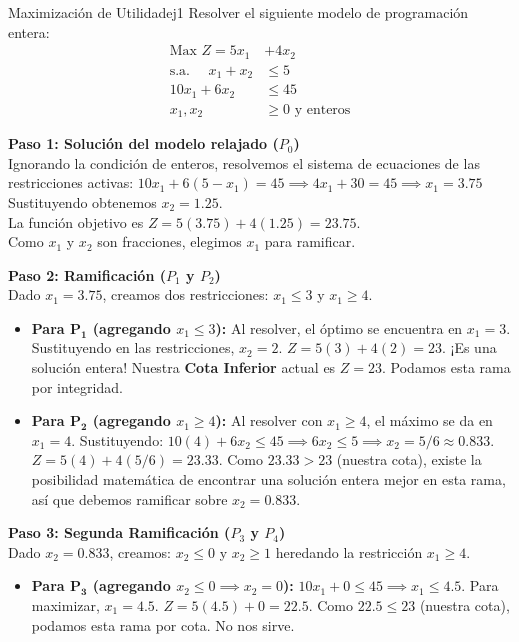 \documentclass[10pt,a4paper]{article}
\begin{document}
\begin{ejercicio}{Maximización de Utilidad}{ej1}
Resolver el siguiente modelo de programación entera:
\begin{align*}
    \text{Max } Z = 5x_1 &+ 4x_2 \\
    \text{s.a. } \quad x_1 + x_2 &\le 5 \\
    10x_1 + 6x_2 &\le 45 \\
    x_1, x_2 &\ge 0 \text{ y enteros}
\end{align*}

\textbf{Paso 1: Solución del modelo relajado ($P_0$)} \\
Ignorando la condición de enteros, resolvemos el sistema de ecuaciones de las restricciones activas:
$10x_1 + 6(5 - x_1) = 45 \implies 4x_1 + 30 = 45 \implies x_1 = 3.75$ \\
Sustituyendo obtenemos $x_2 = 1.25$. \\
La función objetivo es $Z = 5(3.75) + 4(1.25) = 23.75$. \\
Como $x_1$ y $x_2$ son fracciones, elegimos $x_1$ para ramificar.

\vspace{0.3cm}
\textbf{Paso 2: Ramificación ($P_1$ y $P_2$)} \\
Dado $x_1 = 3.75$, creamos dos restricciones: $x_1 \le 3$ y $x_1 \ge 4$.
\begin{itemize}
    \item \textbf{Para $\mathbf{P_1}$ (agregando $x_1 \le 3$):} 
    Al resolver, el óptimo se encuentra en $x_1 = 3$. Sustituyendo en las restricciones, $x_2 = 2$.
    $Z = 5(3) + 4(2) = 23$. ¡Es una solución entera! Nuestra \textbf{Cota Inferior} actual es $Z = 23$. Podamos esta rama por integridad.
    
    \item \textbf{Para $\mathbf{P_2}$ (agregando $x_1 \ge 4$):}
    Al resolver con $x_1 \ge 4$, el máximo se da en $x_1 = 4$.
    Sustituyendo: $10(4) + 6x_2 \le 45 \implies 6x_2 \le 5 \implies x_2 = 5/6 \approx 0.833$.
    $Z = 5(4) + 4(5/6) = 23.33$.
    Como $23.33 > 23$ (nuestra cota), existe la posibilidad matemática de encontrar una solución entera mejor en esta rama, así que debemos ramificar sobre $x_2 = 0.833$.
\end{itemize}

\textbf{Paso 3: Segunda Ramificación ($P_3$ y $P_4$)} \\
Dado $x_2 = 0.833$, creamos: $x_2 \le 0$ y $x_2 \ge 1$ heredando la restricción $x_1 \ge 4$.
\begin{itemize}
    \item \textbf{Para $\mathbf{P_3}$ (agregando $x_2 \le 0 \implies x_2 = 0$):}
    $10x_1 + 0 \le 45 \implies x_1 \le 4.5$. Para maximizar, $x_1 = 4.5$.
    $Z = 5(4.5) + 0 = 22.5$.
    Como $22.5 \le 23$ (nuestra cota), podamos esta rama por cota. No nos sirve.
    

\end{itemize}
\end{ejercicio}
\end{document}

